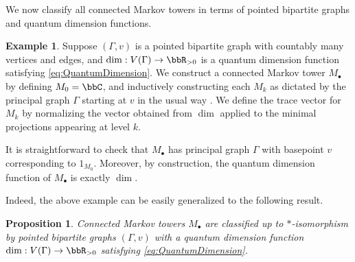 \documentclass[11pt]{article}
\theoremstyle{plain}
\newtheorem{prop}[thm]{Proposition}
\theoremstyle{definition}
\newtheorem{ex}[thm]{Example}
\DeclareMathOperator{\tr}{tr}
\newcommand{\nn}[1]{\textcolor{red}{[[#1]]}}
\begin{document}
We now classify all connected Markov towers in terms of pointed bipartite graphs and quantum dimension functions.

\begin{ex}
Suppose $(\Gamma, v)$ is a pointed bipartite graph with countably many vertices and edges, and $\dim : V(\Gamma) \to \bbR_{>0}$ is a quantum dimension function satisfying \eqref{eq:QuantumDimension}.
We construct a connected Markov tower $M_\bullet$ by defining $M_0 = \bbC$, and inductively constructing each $M_k$ as dictated by the principal graph $\Gamma$ starting at $v$ in the usual way \cite{MR999799,MR1473221}.
We define the trace vector for $M_k$ by normalizing the vector obtained from $\dim$ applied to the minimal projections appearing at level $k$.

It is straightforward to check that $M_\bullet$ has principal graph $\Gamma$ with basepoint $v$ corresponding to $1_{M_0}$.
Moreover, by construction, the quantum dimension function of $M_\bullet$ is exactly $\dim$.
\end{ex}

Indeed, the above example can be easily generalized to the following result.

\begin{prop}
\label{prop:ClassificationOfMarkovTowers}
Connected Markov towers $M_\bullet$ are classified up to $*$-isomorphism by pointed bipartite graphs $(\Gamma,v)$ with a quantum dimension function $\dim: V(\Gamma) \to \bbR_{>0}$ satisfying \eqref{eq:QuantumDimension}.
\end{prop}
%
%
\end{document}
